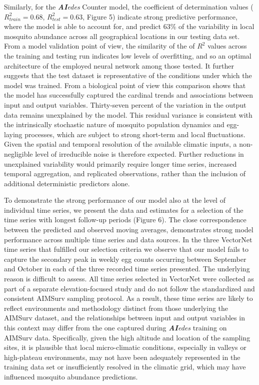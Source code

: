 \documentclass[preprint,12pt]{elsarticle}
\begin{document}
Similarly, for the \textit{\textbf{AI}edes} Counter model, the coefficient of determination values ($R^2_{train}=0.68$, $R^2_{test}=0.63$, Figure 5) indicate strong predictive performance, where the model is able to account for, and predict 63\% of the variability in local mosquito abundance across all geographical locations in our testing data set. From a model validation point of view, the similarity of the  of $R^2$ values across the training and testing run indicates low levels of overfitting, and so an optimal architecture of the employed neural network among those tested. It further suggests that the test dataset is representative of the conditions under which the model was trained. From a biological point of view this comparison shows that the model has successfully captured the cardinal trends and associations between input and output variables. 
Thirty-seven percent of the variation in the output data remains unexplained by the model. This residual variance is consistent with the intrinsically stochastic nature of mosquito population dynamics and egg-laying processes, which are subject to strong short-term and local fluctuations. Given the spatial and temporal resolution of the available climatic inputs, a non-negligible level of irreducible noise is therefore expected. Further reductions in unexplained variability would primarily require longer time series, increased temporal aggregation, and replicated observations, rather than the inclusion of additional deterministic predictors alone.

To demonstrate the strong performance of our model also at the level of individual time series, we present the data and estimates for a selection of the time series with longest follow-up periods (Figure 6). The close correspondence between the predicted and observed moving averages, demonstrates strong model performance across multiple time series and data sources. In the three VectorNet time series that fulfilled our selection criteria we observe that our model fails to capture the secondary peak in weekly egg counts occurring between September and October in each of the three recorded time series presented. The underlying reason is difficult to assess. All time series selected in VectorNet were collected as part of a separate elevation-focused study and do not follow the standardized and consistent AIMSurv sampling protocol. As a result, these time series are likely to reflect environments and methodology distinct from those underlying the AIMSurv dataset, and the relationships between input and output variables in this context may differ from the one captured during \textit{\textbf{AI}edes} training on AIMSurv data. Specifically, given the high altitude and location of the sampling sites, it is plausible that local micro-climatic conditions, especially in valleys or high-plateau environments, may not have been adequately represented in the training data set or insufficiently resolved in the climatic grid, which may have influenced mosquito abundance predictions.
\end{document}
